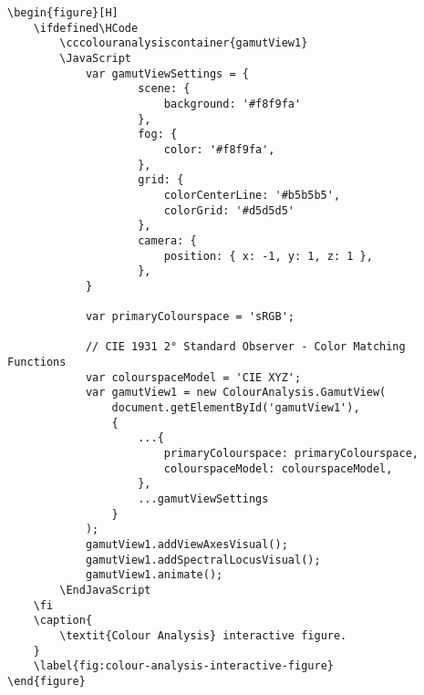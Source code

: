 \begin{lstlisting}[caption={\textit{Colour Analysis} interactive figure.}]
\begin{figure}[H]
    \ifdefined\HCode
        \cccolouranalysiscontainer{gamutView1}
        \JavaScript
            var gamutViewSettings = {
                    scene: {
                        background: '#f8f9fa'
                    },
                    fog: {
                        color: '#f8f9fa',
                    },
                    grid: {
                        colorCenterLine: '#b5b5b5',
                        colorGrid: '#d5d5d5'
                    },
                    camera: {
                        position: { x: -1, y: 1, z: 1 },
                    },
            }

            var primaryColourspace = 'sRGB';

            // CIE 1931 2° Standard Observer - Color Matching Functions
            var colourspaceModel = 'CIE XYZ';
            var gamutView1 = new ColourAnalysis.GamutView(
                document.getElementById('gamutView1'),
                {
                    ...{
                        primaryColourspace: primaryColourspace,
                        colourspaceModel: colourspaceModel,
                    },
                    ...gamutViewSettings
                }
            );
            gamutView1.addViewAxesVisual();
            gamutView1.addSpectralLocusVisual();
            gamutView1.animate();
        \EndJavaScript
    \fi
    \caption{
        \textit{Colour Analysis} interactive figure.
    }
    \label{fig:colour-analysis-interactive-figure}
\end{figure}
\end{lstlisting}

